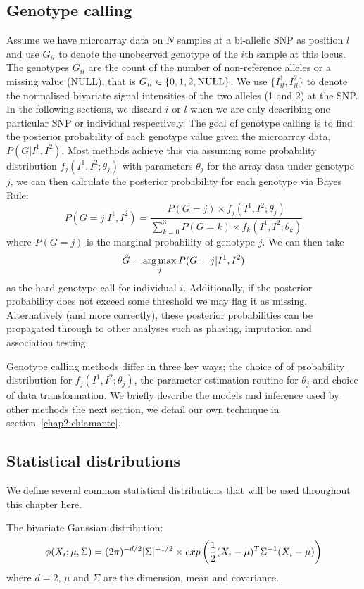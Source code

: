 \subsection{Genotype calling}
Assume we have microarray data on $N$ samples at a bi-allelic SNP as position $l$ and use $G_{il}$ to denote the unobserved genotype of the $i$th sample at this locus. The genotypes $G_{il}$ are the count of the number of non-reference alleles or a missing  value (NULL), that is $G_{il} \in \{0, 1 ,2, \textrm{NULL} \}$. We use $\{I^1_{il}, I^2_{il}\}$ to denote the normalised bivariate signal intensities of the two alleles (1 and 2) at the SNP. In the following sections, we discard  $i$ or $l$ when we are only describing one particular SNP or individual respectively. The goal of genotype calling is to find the posterior probability of each genotype value given the microarray data, $P(G|I^1,I^2)$. Most methods achieve this via assuming some probability distribution $f_j(I^1,I^2;\theta_j)$ with parameters $\theta_j$ for the array data under genotype $j$, we can then calculate the posterior probability for each genotype via Bayes Rule:
$$P(G=j|I^1,I^2) = \frac{ P(G=j)\times f_j(I^1,I^2;\theta_j) } { \sum_{k=0}^3P(G=k)\times f_k(I^1,I^2;\theta_k) }$$
where $P(G=j)$ is the marginal probability of genotype $j$. We can then take $$\hat{G}=\operatorname*{arg\,max}_jP(G=j|I^1,I^2)$$  as the hard genotype call for individual $i$. Additionally, if the posterior probability does not exceed some threshold we may flag it as missing. Alternatively (and more correctly), these posterior probabilities can be propagated through to other analyses such as phasing, imputation and association testing.

Genotype calling methods differ in three key ways; the choice of of probability distribution for $f_j(I^1,I^2;\theta_j)$, the parameter estimation routine for $\theta_j$ and choice of data transformation. We briefly describe the models and inference used by other methods the next section, we detail our own technique in section~\ref{chap2:chiamante}.

\subsection{Statistical distributions}\label{chap2:statdist}
We define several common statistical distributions that will be used throughout this chapter here.  

The bivariate Gaussian distribution:
$$\phi(X_i;\mu,\Sigma) = (2\pi)^{-d/2} |\Sigma|^{-1/2}\times exp\left(\frac{1}{2} (X_i - \mu)^T\Sigma^{-1}(X_i-\mu)\right)$$
where $d=2$, $\mu$ and $\Sigma$ are the dimension, mean and covariance. 

